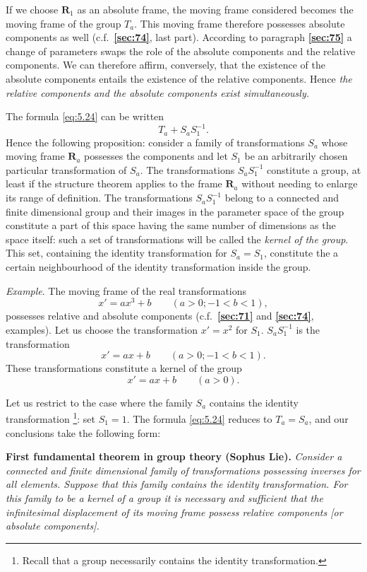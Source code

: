 \documentclass[leqno,11pt]{book}
\numberwithin{equation}{chapter}
\theoremstyle{shape1}
\theoremstyle{shapesmall}
\newcommand{\fsref}[1]{{\rm\textsection\textbf{\ref{sec:#1}}}}
\newcommand{\somespace}{\vspace{9pt}}
\begin{document}
If we choose $\mathbf{R}_{1}$ as an absolute frame, the moving frame considered becomes the moving frame of the group $T_{a}$. This moving frame therefore possesses absolute components as well (c.f.~\fsref{74}, last part).  According to paragraph \fsref{75} a change of parameters swaps the role of the absolute components and the relative components. We can therefore affirm, conversely, that the existence of the absolute components entails the existence of the relative components. Hence \emph{the relative components and the absolute components exist simultaneously.}

The formula \eqref{eq:5.24} can be written
\[
T_{a}+S_{a}S_{1}^{-1}.
\]
Hence the following proposition: consider a family of transformations $S_{a}$ whose moving frame $\mathbf{R}_{a}$ possesses the components and let $S_{1}$ be an arbitrarily chosen particular transformation of $S_{a}$. The transformations $S_{a}S_{1}^{-1}$ constitute a group, at least if the structure theorem applies to the frame $\mathbf{R}_{a}$ without needing to enlarge its range of definition. The transformations $S_{a}S_{1}^{-1}$ belong to a connected and finite dimensional group and their images in the parameter space of the group constitute a part of this space having the same number of dimensions as the space itself: such a set of transformations will be called the \emph{kernel of the group}. This set, containing the identity transformation for $S_{a}=S_{1}$, constitute the a certain neighbourhood of the identity transformation inside the group.

\somespace

{\small
\emph{Example}. The moving frame of the real transformations
\[
x'=ax^{3}+b\qquad(a>0;-1<b<1),
\]
possesses relative and absolute components (c.f.~\fsref{71} and \fsref{74}, examples). Let us choose the transformation $x'=x^{2}$ for $S_{1}$. $S_{a}S_{1}^{-1}$ is the transformation
\[
x'=ax+b\qquad(a>0;-1<b<1).
\]
These transformations constitute a kernel of the group
\[
x'=ax+b\qquad(a>0).
\]
}

Let us restrict to the case where the family $S_{a}$ contains the identity transformation \footnote{Recall that a group necessarily contains the identity transformation.}: set $S_{1}=1$. The formula \eqref{eq:5.24} reduces to $T_{a}=S_{a}$, and our conclusions take the following form:

\somespace

\textbf{First fundamental theorem in group theory (Sophus Lie).} \emph{Consider a connected and finite dimensional family of transformations possessing inverses for all elements. Suppose that this family contains the identity transformation. For this family to be a kernel of a group it is necessary and sufficient that the infinitesimal displacement of its moving frame possess relative components [or absolute components].}
\end{document}
